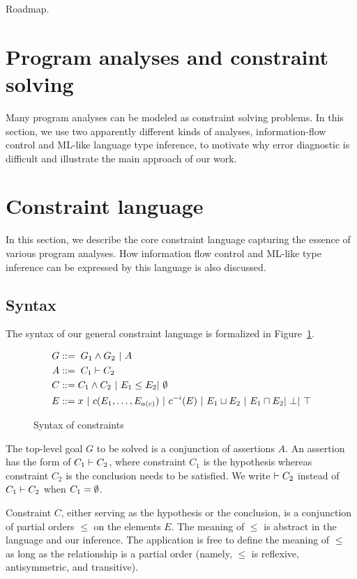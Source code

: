 Roadmap.

\section{Program analyses and constraint solving}

Many program analyses can be modeled as constraint solving problems. In this
section, we use two apparently different kinds of analyses, information-flow
control and ML-like language type inference, to motivate why error diagnostic
is difficult and illustrate the main approach of our work.


\section{Constraint language}
\label{sec:language}

In this section, we describe the core constraint language capturing the essence
of various program analyses. How information flow control and ML-like type
inference can be expressed by this language is also discussed. 

\subsection{Syntax}

The syntax of our general constraint language is formalized in
Figure~\ref{figure:lang:syntax}.

\begin{figure}
\begin{align*}
G &::=\; G_1 \land G_2\ |\ A \\
A &::=\; C_1 \vdash C_2 \\
C &::= C_1 \land C_2\ |\  E_1 \leq E_2 |\ \emptyset \\
E &::= x\ |\ c(E_1,\dots,E_{a(c)})\ |\ c^{-i}(E)\ |\ E_1 \sqcup E_2 \
|\ E_1 \sqcap E_2 |\ \bot |\ \top
\end{align*}
\caption{Syntax of constraints}
\label{figure:lang:syntax}
\end{figure}

The top-level goal $G$ to be solved is a conjunction of assertions $A$. An
assertion has the form of $C_1 \vdash C_2$, where constraint $C_1$ is the
hypothesis whereas constraint $C_2$ is the conclusion needs to be satisfied. We
write $ \vdash C_2$ instead of $ C_1 \vdash C_2$ when $C_1=\emptyset$.

Constraint $C$, either serving as the hypothesis or the conclusion, is a
conjunction of partial orders $\leq$ on the elements $E$. The meaning
of $\leq$ is abstract in the language and our inference. The
application is free to define the meaning of $\leq$ as long as the
relationship is a partial order (namely, $\leq$ is reflexive,
antisymmetric, and transitive).

